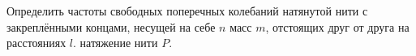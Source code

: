 Определить частоты свободных поперечных колебаний натянутой нити
с закреплёнными концами, несущей на себе $n$ масс $m$,
отстоящих друг от друга на расстояниях $l$.
натяжение нити $P$.
